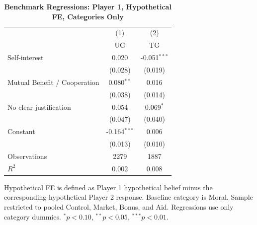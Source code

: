 \begin{table}[!htbp]
\centering
\caption{\textbf{Benchmark Regressions: Player 1, Hypothetical FE, Categories Only}}
\label{tab:cats_only_cats_only_hypfe_regs}
\begin{tabular}{lcc}
\toprule
 & (1) & (2) \\
 & UG & TG \\
\midrule
Self-interest & 0.020 & -0.051$^{***}$ \\
 & (0.028) & (0.019) \\
Mutual Benefit / Cooperation & 0.080$^{**}$ & 0.016 \\
 & (0.038) & (0.014) \\
No clear justification & 0.054 & 0.069$^{*}$ \\
 & (0.047) & (0.040) \\
Constant & -0.164$^{***}$ & 0.006 \\
 & (0.013) & (0.010) \\
\midrule
Observations & 2279 & 1887 \\
$R^2$ & 0.002 & 0.008 \\
\bottomrule
\end{tabular}
\begin{flushleft}
\footnotesize Hypothetical FE is defined as Player 1 hypothetical belief minus the corresponding hypothetical Player 2 response. Baseline category is Moral. Sample restricted to pooled Control, Market, Bonus, and Aid. Regressions use only category dummies. $^{*}p<0.10$, $^{**}p<0.05$, $^{***}p<0.01$.
\end{flushleft}
\end{table}
